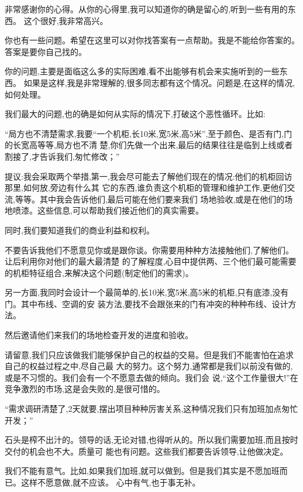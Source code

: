 \documentclass[11pt]{article}
\begin{document}
\begin{yang}
\ylogo 非常感谢你的心得。从你的心得里,我可以知道你的确是留心的,听到一些有用的东西。
这个很好,我非常高兴。

你也有一些问题。希望在这里可以对你找答案有一点帮助。我是不能给你答案的。答案是要你自己找的。

你的问题,主要是面临这么多的实际困难,看不出能够有机会来实施听到的一些东西。
如果是这样,我是非常理解的,很多同志都有这个情况。问题是,在这样的情况,如何处理。

我们最大的问题,也的确是如何从实际的情况下,打破这个恶性循环。比如:

\begin{staff}
  ``局方也不清楚需求,我要``一个机柜,长10米,宽5米,高5米'',至于颜色、是否有门,门的长宽高等等,局方也不清
  楚,你们先做一个出来,最后的结果往往是临到上线或者割接了,才告诉我们,匆忙修改；''
\end{staff}

提议:我会采取两个举措,第一,我会尽可能去了解他们现在的情况:他们的机柜回访那里,如何放,旁边有什么其
它的东西,谁负责这个机柜的管理和维护工作,更他们交流,等等。其中我会告诉他们,最后可能在他们要来我们
场地验收,或是在他们的场地喷漆。这些信息,可以帮助我们接近他们的真实需要。

同时,我们要知道我们的商业利益和权利。

不要告诉我他们不愿意见你或是跟你谈。你需要用种种方法接触他们,了解他们。让后利用你对他们的最大最清楚
的了解程度,心目中提供两、三个他们最可能需要的机柜特征组合,来解决这个问题(制定他们的需求)。

另一方面,我同时会设计一个最简单的,长10米,宽5米,高5米的机柜,只有底漆,没有门。其中布线、空调的安
装方法,要找不会跟张来的门有冲突的种种布线、设计方法。

然后邀请他们来我们的场地检查开发的进度和验收。

请留意,我们只应该做我们能够保护自己的权益的交易。但是我们不能害怕在追求自己的权益过程之中,尽自己最
大的努力。这个努力,通常都是我们以前没有做的,或是不习惯的。我们会有一个不愿意去做的倾向。我们会
说,``这个工作量很大!''在竞争激烈的市场,这是会失败的,是很可惜的。

\begin{staff}
``需求调研清楚了,2天就要,摆出项目种种厉害关系,这种情况我们只有加班加点匆忙开发；''
\end{staff}

石头是榨不出汁的。领导的话,无论对错,也得听从的。所以我们需要加班,而且按时交付的机会也不大。质量可
能也有问题。这些我们都要告诉领导,让他做决定。

我们不能有意气。比如,如果我们加班,就可以做到。但是我们其实是不愿加班而已。这样不愿意做,就不应该。
心中有气,也于事无补。


\end{yang}
\end{document}
